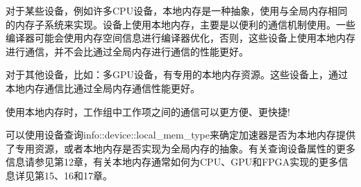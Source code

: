 对于某些设备，例如许多CPU设备，本地内存是一种抽象，使用与全局内存相同的内存子系统来实现。设备上使用本地内存，主要是以便利的通信机制使用。一些编译器可能会使用内存空间信息进行编译器优化，否则，这些设备上使用本地内存进行通信，并不会比通过全局内存进行通信的性能更好。\par

对于其他设备，比如：多GPU设备，有专用的本地内存资源。这些设备上，通过本地内存通信比通过全局内存通信性能更好。\par

\begin{tcolorbox}[colback=red!5!white,colframe=red!75!black]
使用本地内存时，工作组中工作项之间的通信可以更方便、更快捷!
\end{tcolorbox}

可以使用设备查询info::device::local\_mem\_type来确定加速器是否为本地内存提供了专用资源，或者本地内存是否实现为全局内存的抽象。有关查询设备属性的更多信息请参见第12章，有关本地内存通常如何为CPU、GPU和FPGA实现的更多信息详见第15、16和17章。\par





































